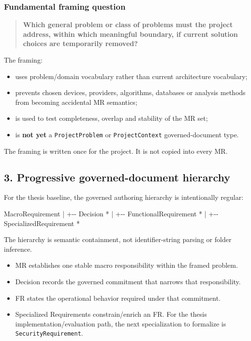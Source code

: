 \documentclass[
  10pt,
]{article}
\newenvironment{Shaded}{}{}
\newcommand{\NormalTok}[1]{#1}
\providecommand{\tightlist}{%
  \setlength{\itemsep}{0pt}\setlength{\parskip}{0pt}}
\begin{document}
\subsubsection{Fundamental framing
question}\label{fundamental-framing-question}

\begin{quote}
\textbf{Which general problem or class of problems must the project
address, within which meaningful boundary, if current solution choices
are temporarily removed?}
\end{quote}

The framing:

\begin{itemize}
\tightlist
\item
  uses problem/domain vocabulary rather than current architecture
  vocabulary;
\item
  prevents chosen devices, providers, algorithms, databases or analysis
  methods from becoming accidental MR semantics;
\item
  is used to test completeness, overlap and stability of the MR set;
\item
  is \textbf{not yet} a \texttt{ProjectProblem} or
  \texttt{ProjectContext} governed-document type.
\end{itemize}

The framing is written once for the project. It is not copied into every
MR.

\subsection{3. Progressive governed-document
hierarchy}\label{3-progressive-governed-document-hierarchy}

For the thesis baseline, the governed authoring hierarchy is
intentionally regular:

\begin{Shaded}
\begin{Highlighting}[]
\NormalTok{MacroRequirement}
\NormalTok{    |}
\NormalTok{    +{-}{-} Decision *}
\NormalTok{           |}
\NormalTok{           +{-}{-} FunctionalRequirement *}
\NormalTok{                  |}
\NormalTok{                  +{-}{-} SpecializedRequirement *}
\end{Highlighting}
\end{Shaded}

The hierarchy is semantic containment, not identifier-string parsing or
folder inference.

\begin{itemize}
\tightlist
\item
  MR establishes one stable macro responsibility within the framed
  problem.
\item
  Decision records the governed commitment that narrows that
  responsibility.
\item
  FR states the operational behavior required under that commitment.
\item
  Specialized Requirements constrain/enrich an FR. For the thesis
  implementation/evaluation path, the next specialization to formalize
  is \texttt{SecurityRequirement}.
\end{itemize}
\end{document}
